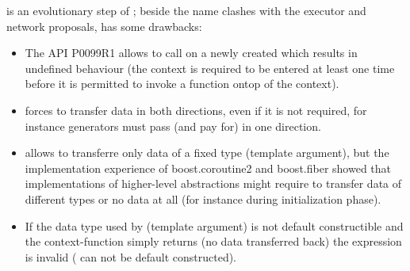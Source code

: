 \label{motivation}

\cc is an evolutionary step of \ectx; beside the name clashes with the executor
and network proposals, \ectx has some drawbacks:
\begin{itemize}
    \item The API P0099R1 allows to call
         on a newly
        created \ectx which results in undefined behaviour (the context is
        required to be entered at least one time before it is permitted to
        invoke a function ontop of the context).
    \item \ectx forces to transfer data in both directions, even if it is not
        required, for instance generators must pass (and pay for)
         in one direction.
    \item \ectx allows to transferre only data of a fixed type (template
        argument), but the implementation experience of boost.coroutine2 and
        boost.fiber showed that implementations of higher-level abstractions
        might require to transfer data of different types or no data at all
        (for instance during initialization phase).
    \item If the data type used by \ectx (template argument) is not default
        constructible and the context-function simply returns (no data
        transferred back) the expression  is
        invalid ( can not be default constructed).
\end{itemize}
